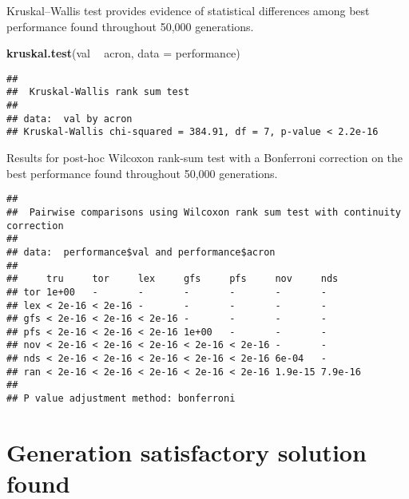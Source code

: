\documentclass[]{book}
\newenvironment{Shaded}{\begin{snugshade}}{\end{snugshade}}
\newcommand{\DataTypeTok}[1]{\textcolor[rgb]{0.13,0.29,0.53}{#1}}
\newcommand{\KeywordTok}[1]{\textcolor[rgb]{0.13,0.29,0.53}{\textbf{#1}}}
\newcommand{\NormalTok}[1]{#1}
\newcommand{\OperatorTok}[1]{\textcolor[rgb]{0.81,0.36,0.00}{\textbf{#1}}}
\newcommand{\OtherTok}[1]{\textcolor[rgb]{0.56,0.35,0.01}{#1}}
\newcommand{\StringTok}[1]{\textcolor[rgb]{0.31,0.60,0.02}{#1}}
\begin{document}
Kruskal--Wallis test provides evidence of statistical differences among best performance found throughout 50,000 generations.

\begin{Shaded}
\begin{Highlighting}[]
\KeywordTok{kruskal.test}\NormalTok{(val }\OperatorTok{~}\StringTok{ }\NormalTok{acron, }\DataTypeTok{data =}\NormalTok{ performance)}
\end{Highlighting}
\end{Shaded}

\begin{verbatim}
## 
##  Kruskal-Wallis rank sum test
## 
## data:  val by acron
## Kruskal-Wallis chi-squared = 384.91, df = 7, p-value < 2.2e-16
\end{verbatim}

Results for post-hoc Wilcoxon rank-sum test with a Bonferroni correction on the best performance found throughout 50,000 generations.

\begin{Shaded}
\end{Shaded}

\begin{verbatim}
## 
##  Pairwise comparisons using Wilcoxon rank sum test with continuity correction 
## 
## data:  performance$val and performance$acron 
## 
##     tru     tor     lex     gfs     pfs     nov     nds    
## tor 1e+00   -       -       -       -       -       -      
## lex < 2e-16 < 2e-16 -       -       -       -       -      
## gfs < 2e-16 < 2e-16 < 2e-16 -       -       -       -      
## pfs < 2e-16 < 2e-16 < 2e-16 1e+00   -       -       -      
## nov < 2e-16 < 2e-16 < 2e-16 < 2e-16 < 2e-16 -       -      
## nds < 2e-16 < 2e-16 < 2e-16 < 2e-16 < 2e-16 6e-04   -      
## ran < 2e-16 < 2e-16 < 2e-16 < 2e-16 < 2e-16 1.9e-15 7.9e-16
## 
## P value adjustment method: bonferroni
\end{verbatim}

\hypertarget{generation-satisfactory-solution-found}{%
\section{Generation satisfactory solution found}\label{generation-satisfactory-solution-found}}
\end{document}
